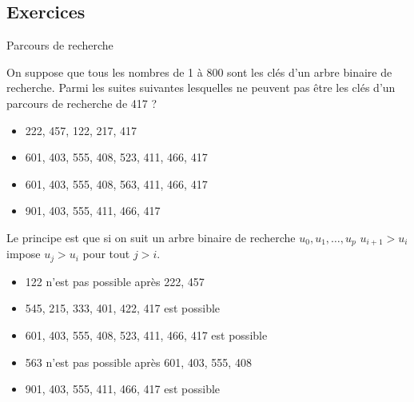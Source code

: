 \subsection{Exercices}
\begin{exo}{Parcours de recherche}{}

On suppose que tous les nombres de 1 à 800 sont les clés d'un 
arbre binaire de recherche. Parmi les suites suivantes lesquelles ne peuvent pas être les clés d'un parcours de recherche de 417 ?

\begin{itemize}

\item 222, 457, 122, 217, 417

\item 601, 403, 555, 408, 523, 411, 466, 417

\item 601, 403, 555, 408, 563, 411, 466, 417

\item 901, 403, 555, 411, 466, 417
\end{itemize}
\reponse
Le principe est que si on suit un arbre binaire de recherche $u_0, u_1, \ldots, u_p$ $u_{i+1} > u_i$ impose $u_j > u_i$ pour tout $j>i$.


\begin{itemize}
\item 122 n'est pas possible après 222, 457

\item 545, 215, 333, 401, 422, 417 est possible 


\item 601, 403, 555, 408, 523, 411, 466, 417 est possible


\item 563 n'est pas possible après 601, 403, 555, 408


\item 901, 403, 555, 411, 466, 417 est possible
\end{itemize}
\end{exo}
